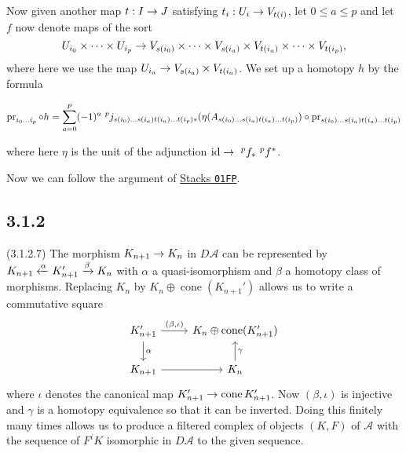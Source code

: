 \documentclass[deligne.tex]{subfiles}
\begin{document}
Now given another map $t:I\rightarrow J$ satisfying $t_i:U_i\rightarrow V_{t(i)}$,
let $0\leq a\leq p$ and let $f$ now denote maps of the sort
\begin{equation*}
	U_{i_0}\times\cdots\times U_{i_p}
	\rightarrow V_{s(i_0)}\times\cdots\times V_{s(i_a)}\times
	V_{t(i_a)}\times\cdots\times V_{t(i_p)},
\end{equation*}
where here we use the map $U_{i_a}\rightarrow V_{s(i_a)}\times V_{t(i_a)}$.
We set up a homotopy $h$ by the formula
\begin{ceqn}\begin{equation*}
	\operatorname{pr}_{i_0\ldots i_p}\circ h
	=\sum_{a=0}^p (-1)^a\
	^pj_{s(i_0)\ldots s(i_a)t(i_a)\ldots t(i_p)*}(\eta(A_{s(i_0)\ldots s(i_a)t(i_a)\ldots t(i_p)})
	\circ\operatorname{pr}_{s(i_0)\ldots s(i_a)t(i_a)\ldots t(i_p)}
\end{equation*}\end{ceqn}
where here $\eta$ is the unit of the adjunction
$\id\ra\ ^pf_*\ ^pf^*$.

Now we can follow the argument of
\href{https://stacks.math.columbia.edu/tag/01FP}{Stacks \texttt{01FP}}.

\subsection*{3.1.2}
(3.1.2.7) The morphism $K_{n+1}\rightarrow K_n$ in $D\mathcal A$ can be represented
by $K_{n+1}\xleftarrow{\alpha} K'_{n+1}\xrightarrow\beta K_n$ with $\alpha$ a
quasi-isomorphism and $\beta$ a homotopy class of morphisms.
Replacing $K_n$ by $K_n\oplus\operatorname{cone}(K_{n+1}')$ allows us to
write a commutative square
\begin{equation*}\begin{tikzcd}
	K_{n+1}'\arrow[d,"\alpha"]\arrow[r,"{(\beta,\iota)}"]
	&K_n\oplus\operatorname{cone}(K_{n+1}') \\
	K_{n+1}\arrow[r]&K_n\arrow[u,"\gamma"']
\end{tikzcd}\end{equation*}
where $\iota$ denotes the canonical map
$K_{n+1}'\rightarrow\operatorname{cone}K'_{n+1}$.
Now $(\beta,\iota)$ is injective and $\gamma$ is a homotopy equivalence
so that it can be inverted. Doing this finitely many times allows us to
produce a filtered complex of objects $(K,F)$ of $\mathcal A$ with the
sequence of $F^iK$ isomorphic in $D\mathcal A$ to the given sequence.
\end{document}
